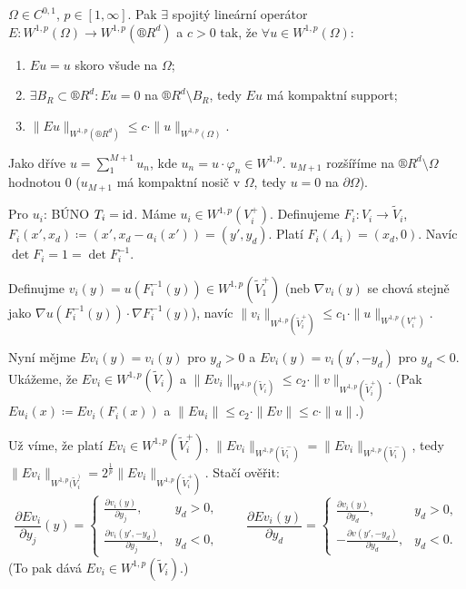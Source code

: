 \documentclass[12pt]{article}					%
\begin{document}
\begin{veta}
	$Ω \in C^{0, 1}$, $p \in [1, ∞]$. Pak $\exists$ spojitý lineární operátor $E: W^{1, p}(Ω) \rightarrow W^{1, p}(®R^d)$ a $c > 0$ tak, že $\forall u \in W^{1, p}(Ω)$:
	\begin{enumerate}
		\item $E u = u$ skoro všude na $Ω$;
		\item $\exists B_R \subset ®R^d: E u = 0$ na $®R^d \setminus B_R$, tedy $E u$ má kompaktní support;
		\item $\|E u\|_{W^{1, p}(®R^d)} ≤ c·\|u\|_{W^{1, p}(Ω)}$.
	\end{enumerate}

	\begin{dukazin}
		Jako dříve $u = \sum_1^{M+1} u_n$, kde $u_n = u · φ_n \in W^{1, p}$. $u_{M+1}$ rozšíříme na $®R^d \setminus Ω$ hodnotou 0 ($u_{M+1}$ má kompaktní nosič v $Ω$, tedy $u = 0$ na $\partial Ω$).

		Pro $u_i$: BÚNO $T_i = \operatorname{id}$. Máme $u_i \in W^{1, p}(V_i^+)$. Definujeme $F_i: V_i \rightarrow \tilde V_i$, $F_i(x', x_d) \coloneq (x', x_d - a_i(x')) = (y', y_d)$. Platí $F_i(Λ_i) = (x_d, 0)$. Navíc $\det F_i = 1 = \det F_i^{-1}$.

		Definujme $v_i(y) = u(F_i^{-1}(y)) \in W^{1, p}(\tilde V_1^+)$ (neb $\nabla v_i(y)$ se chová stejně jako $\nabla u(F_i^{-1}(y))·\nabla F_i^{-1}(y)$), navíc $\|v_i\|_{W^{1, p}(\tilde V_i^+)} ≤ c_1·\|u\|_{W^{1, p}(V_i^+)}$.

		Nyní mějme $E v_i(y) = v_i(y)$ pro $y_d > 0$ a $E v_i(y) = v_i(y', -y_d)$ pro $y_d < 0$. Ukážeme, že $E v_i \in W^{1, p}(\tilde V_i)$ a $\|E v_i\|_{W^{1, p}(\tilde V_i)} ≤ c_2·\|v\|_{W^{1, p}(\tilde V_i^+)}$. (Pak $E u_i(x) \coloneq E v_i(F_i(x))$ a $\|E u_i\| ≤ c_2·\|E v\| ≤ c·\|u\|$.)

		Už víme, že platí $Ev_i \in W^{1, p}(\tilde V_i^+)$, $\|E v_i\|_{W^{1, p}(\tilde V_i^-)} = \|E v_i\|_{W^{1, p}(\tilde V_i^-)}$, tedy $\|E v_i\|_{W^{1, p}(\tilde V_i^)} = 2^{\frac{1}{p}} \|E v_i\|_{W^{1, p}(\tilde V_i^+)}$. Stačí ověřit:
		$$ \frac{\partial E v_i}{\partial y_j}(y) = \begin{cases}\frac{\partial v_i(y)}{\partial y_j},& y_d > 0,\\ \frac{\partial v_i(y', -y_d)}{\partial y_j},& y_d < 0,\end{cases} \qquad \frac{\partial E v_i(y)}{\partial y_d} = \begin{cases}\frac{\partial v_i(y)}{\partial y_d}, & y_d > 0,\\ -\frac{\partial v(y', -y_d)}{\partial y_d}, & y_d < 0.\end{cases} $$
		(To pak dává $E v_i \in W^{1, p}(\tilde V_i)$.)


\end{dukazin}
\end{veta}
\end{document}
